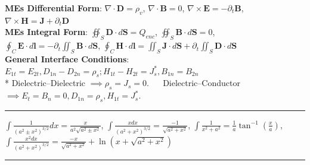 \documentclass[12pt]{article}
\begin{document}
\vspace*{-1em}
\textbf{MEs Differential Form}:
$\nabla \cdot \mathbf{D} = {\rho_v}$,
$\nabla \cdot \mathbf{B} = 0$,
$\nabla \times \mathbf{E} = -\partial_t \mathbf{B}$,
$\nabla \times \mathbf{H} = \mathbf{J} + \partial_t \mathbf{D}$ \\
\textbf{MEs Integral Form}:
$\oiint_S \mathbf{D} \cdot d\mathbf{S} = {Q_{enc}}$,
$\oiint_S \mathbf{B} \cdot d\mathbf{S} = 0$,
$\oint_C \mathbf{E} \cdot d\mathbf{l} = -\partial_t\iint_S \mathbf{B} \cdot d\mathbf{S}$,
$\oint_C \mathbf{H} \cdot d\mathbf{l} = \iint_S \mathbf{J} \cdot d\mathbf{S} + \partial_t\iint_S \mathbf{D} \cdot d\mathbf{S}$ \\
\textbf{General Interface Conditions}: $E_{1t}=E_{2t}, D_{1n}-D_{2n}=\rho_{s}; H_{1t}-H_{2t}=J_s^*, B_{1n}=B_{2n}$ \\
* Dielectric--Dielectric \(\implies \rho _{s} = J_{s} = 0 \). \( \quad \)
Dielectric--Conductor \( \implies E_{t} = B_{n} = 0, D_{1n} = \rho _{s}, H_{1t} = J_s^* \).
\hrule

$\int \frac{1}{\left(a^2 \pm x^2\right)^{3 / 2}} d x=\frac{x}{a^2 \sqrt{a^2 \pm x^2}}$, $\int \frac{x d x}{\left(a^2+x^2\right)^{3 / 2}}=\frac{-1}{\sqrt{a^2+x^2}}$, $\int \frac{1}{x^2+a^2}=\frac{1}{a} \tan ^{-1}\left(\frac{x}{a}\right)$, $\int \frac{x^2 d x}{\left(a^2+x^2\right)^{3 / 2}}=\frac{-x}{\sqrt{a^2+x^2}}+\ln(x+\sqrt{a^2+x^2})$

\hrule
\end{document}
